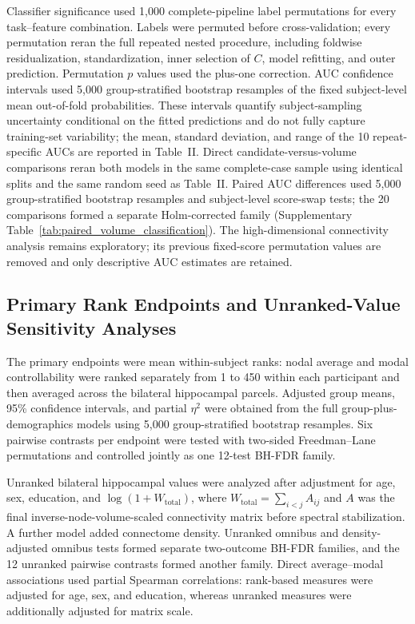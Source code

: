 \documentclass{article}
\begin{document}
Classifier significance used 1,000 complete-pipeline label permutations for every task--feature combination. Labels were permuted before cross-validation; every permutation reran the full repeated nested procedure, including foldwise residualization, standardization, inner selection of \(C\), model refitting, and outer prediction. Permutation \(p\) values used the plus-one correction. AUC confidence intervals used 5,000 group-stratified bootstrap resamples of the fixed subject-level mean out-of-fold probabilities. These intervals quantify subject-sampling uncertainty conditional on the fitted predictions and do not fully capture training-set variability; the mean, standard deviation, and range of the 10 repeat-specific AUCs are reported in Table~II. Direct candidate-versus-volume comparisons reran both models in the same complete-case sample using identical splits and the same random seed as Table~II. Paired AUC differences used 5,000 group-stratified bootstrap resamples and subject-level score-swap tests; the 20 comparisons formed a separate Holm-corrected family (Supplementary Table~\ref{tab:paired_volume_classification}). The high-dimensional connectivity analysis remains exploratory; its previous fixed-score permutation values are removed and only descriptive AUC estimates are retained.

\subsection{Primary Rank Endpoints and Unranked-Value Sensitivity Analyses}
The primary endpoints were mean within-subject ranks: nodal average and modal controllability were ranked separately from 1 to 450 within each participant and then averaged across the bilateral hippocampal parcels. Adjusted group means, 95\% confidence intervals, and partial \(\eta^2\) were obtained from the full group-plus-demographics models using 5,000 group-stratified bootstrap resamples. Six pairwise contrasts per endpoint were tested with two-sided Freedman--Lane permutations and controlled jointly as one 12-test BH-FDR family.

Unranked bilateral hippocampal values were analyzed after adjustment for age, sex, education, and \(\log(1+W_{\mathrm{total}})\), where \(W_{\mathrm{total}}=\sum_{i<j}A_{ij}\) and \(A\) was the final inverse-node-volume-scaled connectivity matrix before spectral stabilization. A further model added connectome density. Unranked omnibus and density-adjusted omnibus tests formed separate two-outcome BH-FDR families, and the 12 unranked pairwise contrasts formed another family. Direct average--modal associations used partial Spearman correlations: rank-based measures were adjusted for age, sex, and education, whereas unranked measures were additionally adjusted for matrix scale.
\end{document}
